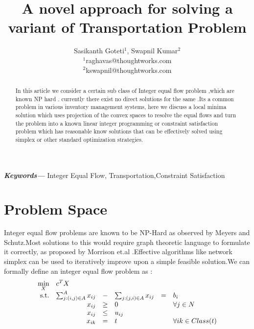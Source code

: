 \documentclass[a4paper]{article}
\title{A novel approach for solving a variant of Transportation Problem}
\author{Sasikanth Goteti$^{1}$, Swapnil Kumar$^{2}$  \\
            \small $^{1}$raghavas@thoughtworks.com \\
            \small $^{2}$kswapnil@thoughtworks.com \\
    }
\date{} %
\providecommand{\keywords}[1]
    {
      \small	
      \textbf{\textit{Keywords---}} #1
    }
\begin{document}
    \maketitle
    
    \begin{abstract}
        In this article we consider a certain sub class of Integer equal flow problem ,which are known NP hard \cite{meyers}. 
        currently there exist no direct solutions for the same .Its a common problem in various inventory management systems,
        here we discuss a local minima solution which uses projection of the convex spaces to resolve the equal flows and turn 
        the problem into a known linear integer programming or constraint satisfaction problem which has reasonable know solutions that can be 
        effectively solved using simplex or other standard optimization strategies.
       \end{abstract}
    \keywords{Integer Equal Flow, Transportation,Constraint Satisfaction}
     
    \maketitle
    
    \section{Problem Space}
    Integer equal flow problems are known to be NP-Hard as observed by Meyers and Schutz\cite{meyers}.Most solutions to this would
    require graph theoretic language to formulate it correctly, as proposed by Morrison et.al \cite{Morrison2013ANS}.Effective
    algorithms like network simplex can be used to iteratively improve upon a simple feasible solution.We can formally define an
    integer equal flow problem as :
    \begin{equation}
        \begin{array}{rrclcl}
        \displaystyle \min_{X} & \multicolumn{3}{l}{c^T X} \\
        \textrm{s.t.} & \sum_{j:(i,j) \in A }^A x_{ij} & - & \sum_{j:(j,i) \in A } x_{ij} & = & b_i \\
        & x_{ij} & \geq & 0 & & \forall j \in N \\
        & x_{ij} & \leq & u_{ij} \\
        & x_{ik} &= & t && \forall {ik}\in Class(t)
        \end{array}
        \end{equation}
\end{document}
